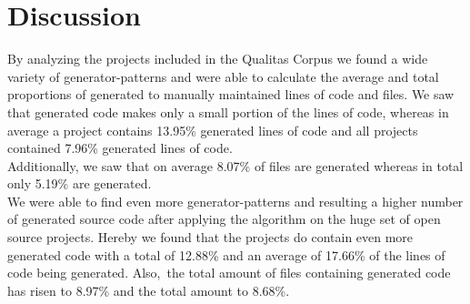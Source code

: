 


\cleardoublepage{}
\section{Discussion}
By analyzing the projects included in the Qualitas Corpus we found a wide variety of generator-patterns and were able to calculate the average and total proportions of generated to manually maintained lines of code and files. We saw that generated code makes only a small portion of the lines of code, whereas in average a project contains 13.95\% generated lines of code and all projects contained 7.96\% generated lines of code.\\
Additionally, we saw that on average 8.07\% of files are generated whereas in total only 5.19\% are generated.\\
We were able to find even more generator-patterns and resulting a higher number of generated source code after applying the algorithm on the huge set of open source projects. Hereby we found that the projects do contain even more generated code with a total of 12.88\% and an average of 17.66\% of the lines of code being generated. Also,~the total amount of files containing generated code has risen to 8.97\% and the total amount to 8.68\%.

